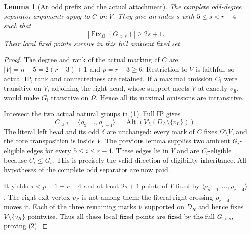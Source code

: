 \documentclass[11pt,a4paper]{article}
\newtheorem{lemma}{Lemma}
\newcommand{\gen}[1]{\langle#1\rangle}
\newcommand{\Alt}{\operatorname{Alt}}
\begin{document}
\begin{lemma}[An odd prefix and the actual attachment]
The complete odd-degree separator arguments apply to $C$ on $V$.
They give an index $s$ with $5\le s<r-4$ such that
\[
             |\operatorname{Fix}_{\Omega}(G_{>s})|\ge2s+1.
                                                               \tag{2}
\]
Their local fixed points survive in this full ambient fixed set.
\end{lemma}
\begin{proof}
The degree and rank of the actual marking of $C$ are
$|V|=n-5=2(r-3)+1$ and $p=r-3\ge6$. Restriction to $V$
is faithful, so actual IP, rank and connectedness are retained.
If a maximal omission $C_i$ were transitive on $V$, adjoining
the right head, whose support meets $V$ at exactly $v_R$,
would make $G_i$ transitive on $\Omega$. Hence all its maximal
omissions are intransitive.

Intersect the two actual natural groups in (1). Full IP gives
\[
 C_{\ge3}=\gen{\rho_3,\ldots,\rho_{r-4}}
     =\Alt(V\setminus(D_L\setminus\{v_L\})).
\]
The literal left head and its odd $\delta$ are unchanged:
every mark of $C$ fixes $\Omega\setminus V$, and the core
transposition is inside $V$. The previous lemma supplies two
ambient $G_i$-eligible edges for every $5\le i\le r-4$.
These edges lie in $V$ and are $C_i$-eligible because
$C_i\le G_i$. This is precisely the valid direction of
eligibility inheritance. All hypotheses of the complete odd
separator are now paid.

It yields $s<p-1=r-4$ and at least $2s+1$ points of $V$
fixed by $\gen{\rho_{s+1},\ldots,\rho_{r-4}}$.
The right exit vertex $v_R$ is not among them: the literal
right crossing $\rho_{r-4}$ moves it. Each of the three
remaining marks is supported on $D_R$ and hence fixes
$V\setminus\{v_R\}$ pointwise. Thus all these local fixed
points are fixed by the full $G_{>s}$, proving (2).
\end{proof}
\end{document}
